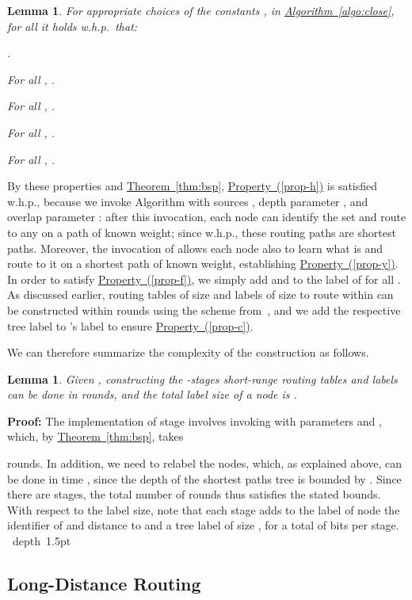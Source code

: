 \documentclass[letterpaper,11pt]{article}
\newcommand{\namedref}[2]{\hyperref[#2]{#1~\ref*{#2}}}
\newcommand{\theoremref}[1]{\namedref{Theorem}{#1}}
\newcommand{\algref}[1]{\namedref{Algorithm}{#1}}
\newcommand{\pprtyref}[1]{\hyperref[#1]{Property~(\ref*{#1})}}
\newtheorem{lemma}[theorem]{Lemma}
\newcommand{\blackslug}{\hbox{\hskip 1pt \vrule width 4pt height 8pt
depth 1.5pt \hskip 1pt}}
\newcommand{\QED}{\quad\blackslug\lower 8.5pt\null\par}
\newenvironment{proof}[1][Proof:]{\noindent \textbf{#1}\xspace}{\QED}
\begin{document}
\begin{lemma}\label{lem-short-corr1-general}
For appropriate choices of the constants ,  in
\algref{algo:close}, for all  it holds w.h.p.\ that:
\begin{compactitem}
\item  .
\item For all , .
\item For all , .
\item For all , .
\item For all , .
\end{compactitem}
\end{lemma}

By these properties and \theoremref{thm:bsp}, \pprtyref{prop-h} is satisfied
w.h.p., because we invoke Algorithm  with sources , depth parameter
, and overlap parameter : after this invocation, each node 
can identify the set  and route to any  on a path of known
weight; since  w.h.p., these routing paths are
shortest paths. Moreover, the invocation of  allows each
node  also to learn what is  and route to it on a shortest path
of known weight, establishing \pprtyref{prop-y}. In order to satisfy
\pprtyref{prop-f}, we simply add  and
 to the label of  for all . As
discussed earlier, routing tables of size  and labels of
size  to route within  can be constructed within
 rounds using the scheme from~\cite{TZ-routing}, and we add the
respective tree label to 's label to ensure \pprtyref{prop-c}.

We can therefore summarize the complexity of the construction as follows.
\begin{lemma}
\label{lem-short-perf}
Given , constructing the -stages short-range routing
tables and labels can be done in  rounds, and the total label size of a
node is .
\end{lemma}
\begin{proof}
The implementation of stage  involves invoking  with
parameters  and , which, by 
\theoremref{thm:bsp}, takes 

rounds. In addition, we need to relabel the nodes, which, as explained above,
can be done in time , since the
depth of the shortest paths tree is bounded by . Since
there are  stages, the total number of rounds thus satisfies
the stated bounds. With respect to the label size, note that each stage  adds
to the label of node  the identifier of and distance to  and a
tree label of size , for a total of  bits per
stage.
\end{proof}

\subsection{Long-Distance Routing}
\label{sec:skeleton}
\end{document}
